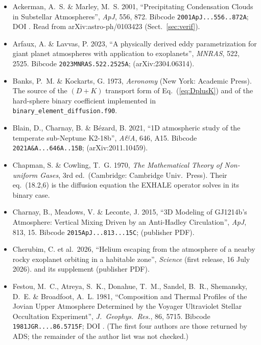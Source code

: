 \documentclass[english,a4paper]{my_memo}
\begin{document}
\begin{itemize}\itemsep2pt

\item Ackerman, A.~S. \& Marley, M.~S. 2001, ``Precipitating Condensation
Clouds in Substellar Atmospheres'', \textit{ApJ}, 556, 872.
Bibcode \texttt{2001ApJ...556..872A}; DOI .
Read from arXiv:astro-ph/0103423 (Sect.~\ref{sec:verif}).

\item Arfaux, A. \& Lavvas, P. 2023, ``A physically derived eddy
parametrization for giant planet atmospheres with application to
exoplanets'', \textit{MNRAS}, 522, 2525.
Bibcode \texttt{2023MNRAS.522.2525A};
(arXiv:2304.06314).

\item Banks, P.~M. \& Kockarts, G. 1973, \textit{Aeronomy} (New York:
Academic Press). The source of the $(D+K)$ transport form of
Eq.~(\ref{eq:DplusK}) and of the hard-sphere binary coefficient
implemented in \texttt{binary\_element\_diffusion.f90}.

\item Blain, D., Charnay, B. \& B\'ezard, B. 2021, ``1D atmospheric study of
the temperate sub-Neptune K2-18b'', \textit{A\&A}, 646, A15.
Bibcode \texttt{2021A\&A...646A..15B};
(arXiv:2011.10459).

\item Chapman, S. \& Cowling, T.~G. 1970, \textit{The Mathematical Theory of
Non-uniform Gases}, 3rd ed.\ (Cambridge: Cambridge Univ.\ Press).
Their eq.~(18.2,6) is the diffusion equation the EXHALE operator solves in
its binary case.

\item Charnay, B., Meadows, V. \& Leconte, J. 2015, ``3D Modeling of
GJ1214b's Atmosphere: Vertical Mixing Driven by an Anti-Hadley
Circulation'', \textit{ApJ}, 813, 15. Bibcode \texttt{2015ApJ...813...15C};
 (publisher PDF).

\item Cherubim, C. et al.\ 2026, ``Helium escaping from the atmosphere of a
nearby rocky exoplanet orbiting in a habitable zone'', \textit{Science}
(first release, 16 July 2026).
 and its supplement
(publisher PDF).

\item Festou, M.~C., Atreya, S.~K., Donahue, T.~M., Sandel, B.~R., Shemansky,
D.~E. \& Broadfoot, A.~L. 1981, ``Composition and Thermal Profiles of the
Jovian Upper Atmosphere Determined by the Voyager Ultraviolet Stellar
Occultation Experiment'', \textit{J.\ Geophys.\ Res.}, 86, 5715.
Bibcode \texttt{1981JGR....86.5715F}; DOI
. (The first four authors are those
returned by ADS; the remainder of the author list was not checked.)


\end{itemize}
\end{document}
